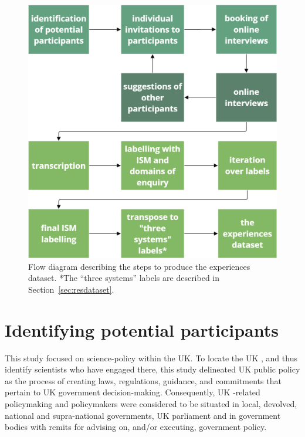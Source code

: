 




\begin{figure}[!ht]
    \centering
    \includegraphics[width=.75\linewidth]{figures/method_flow.png}
    \caption{Flow diagram describing the steps to produce the experiences dataset. *The ``three systems'' labels are described in Section~\ref{sec:resdataset}.}
    \label{fig:metflowchart}
\end{figure}

\section{Identifying potential participants}\label{sec:metidentify}
This study focused on \CAN{} science-policy within the UK. To locate the UK \SPI, and thus identify scientists who have engaged there, this study delineated UK public policy as the process of creating laws, regulations, guidance, and commitments that pertain to UK government decision-making. Consequently, UK \CAN-related policymaking and policymakers were considered to be situated in local, devolved, national and supra-national governments, UK parliament and in government bodies with remits for advising on, and/or executing, \CAN{} government policy.

